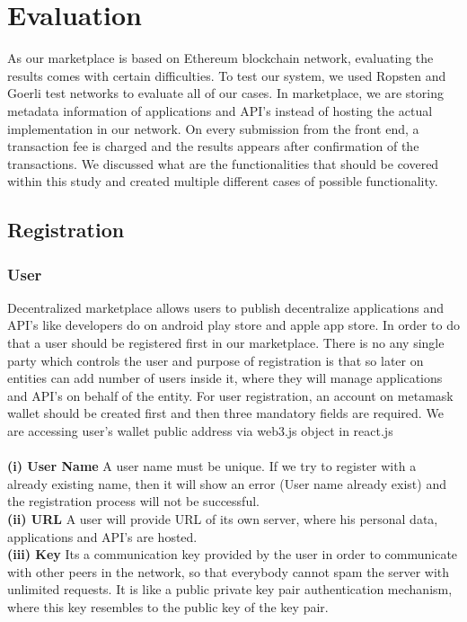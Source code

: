 \chapter{Evaluation}
\label{cha:evaluation}

As our marketplace is based on Ethereum blockchain network, evaluating the results comes with certain difficulties. To test our system, we used Ropsten and Goerli test networks to evaluate all of our cases. In marketplace, we are storing metadata information of applications and API's instead of hosting the actual implementation in our network. On every submission from the front end, a transaction fee is charged and the results appears after confirmation of the transactions. We discussed what are the functionalities that should be covered within this study and created multiple different cases of possible functionality.

\section {Registration}
\subsection{User} Decentralized marketplace allows users to publish decentralize applications and API's like developers do on android play store and apple app store. In order to do that a user should be registered first in our marketplace. There is no any single party which controls the user and purpose of registration is that so later on entities can add number of users inside it, where they will manage applications and API's on behalf of the entity. For user registration, an account on metamask wallet should be created first and then three mandatory fields are required. We are accessing user's wallet public address via web3.js object in react.js\\\\
\textbf{(i) User Name} 
A user name must be unique. If we try to register with a already existing name, then it will show an error (User name already exist) and the registration process will not be successful.\\
\textbf{(ii) URL}
A user will provide URL of its own server, where his personal data,  applications and API's are hosted.\\
\textbf{(iii) Key}
Its a communication key provided by the user in order to communicate with other peers in the network, so that everybody cannot spam the server with unlimited requests. It is like a public private key pair authentication mechanism, where this key resembles to the public key of the key pair.

